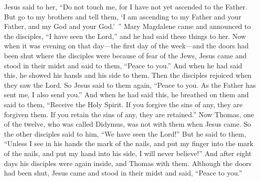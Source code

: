 \begin{biblechapter}
\verse Jesus said to her, “Do not touch me, for I have not yet ascended to the Father. But go to my brothers and tell them, ‘I am ascending to my Father and your Father, and my God and your God.’ ”
\verse Mary Magdalene came and announced to the disciples, “I have seen the Lord,” and he had said these things to her.
 Now when it was evening on that day—the first day of the week—and the doors had been shut where the disciples were because of fear of the Jews, Jesus came and stood in their midst and said to them, “Peace to you.”
\verse And when he had said this, he showed his hands and his side to them. Then the disciples rejoiced when they saw the Lord.
\verse So Jesus said to them again, “Peace to you. As the Father has sent me, I also send you.”
\verse And when he had said this, he breathed on them and said to them, “Receive the Holy Spirit.
\verse If you forgive the sins of any, they are forgiven them. If you retain the sins of any, they are retained.”
 Now Thomas, one of the twelve, who was called Didymus, was not with them when Jesus came.
\verse So the other disciples said to him, “We have seen the Lord!” But he said to them, “Unless I see in his hands the mark of the nails, and put my finger into the mark of the nails, and put my hand into his side, I will never believe!”
\verse And after eight days his disciples were again inside, and Thomas with them. Although the doors had been shut, Jesus came and stood in their midst and said, “Peace to you.”

\end{biblechapter}
